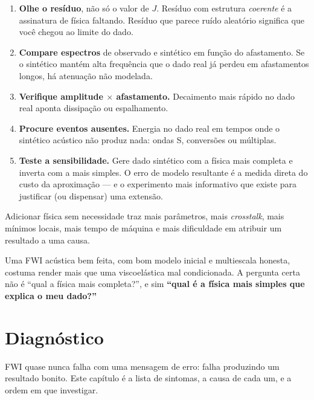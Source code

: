 \documentclass[11pt,a4paper,oneside]{report}
\begin{document}
\begin{enumerate}[leftmargin=*]
\item \textbf{Olhe o res\'iduo}, n\~ao s\'o o valor de $J$. Res\'iduo com
estrutura \emph{coerente} \'e a assinatura de f\'isica faltando. Res\'iduo que
parece ru\'ido aleat\'orio significa que voc\^e chegou ao limite do dado.
\item \textbf{Compare espectros} de observado e sint\'etico em fun\c{c}\~ao do
afastamento. Se o sint\'etico mant\'em alta frequ\^encia que o dado real j\'a
perdeu em afastamentos longos, h\'a atenua\c{c}\~ao n\~ao modelada.
\item \textbf{Verifique amplitude $\times$ afastamento.} Decaimento mais
r\'apido no dado real aponta dissipa\c{c}\~ao ou espalhamento.
\item \textbf{Procure eventos ausentes.} Energia no dado real em tempos onde o
sint\'etico ac\'ustico n\~ao produz nada: ondas S, convers\~oes ou m\'ultiplas.
\item \textbf{Teste a sensibilidade.} Gere dado sint\'etico com a f\'isica mais
completa e inverta com a mais simples. O erro de modelo resultante \'e a
medida direta do custo da aproxima\c{c}\~ao --- e o experimento mais
informativo que existe para justificar (ou dispensar) uma extens\~ao.
\end{enumerate}

\begin{armadilha}
Adicionar f\'isica sem necessidade traz mais par\^ametros, mais
\emph{crosstalk}, mais m\'inimos locais, mais tempo de m\'aquina e mais
dificuldade em atribuir um resultado a uma causa.

Uma FWI ac\'ustica bem feita, com bom modelo inicial e multiescala honesta,
costuma render mais que uma viscoel\'astica mal condicionada. A pergunta certa
n\~ao \'e ``qual a f\'isica mais completa?'', e sim \textbf{``qual \'e a
f\'isica mais simples que explica o meu dado?''}
\end{armadilha}

\chapter{Diagn\'ostico}
\label{cap:diagnostico}

\begin{ideia}
FWI quase nunca falha com uma mensagem de erro: falha produzindo um resultado
bonito. Este cap\'itulo \'e a lista de sintomas, a causa de cada um, e a ordem
em que investigar.
\end{ideia}
\end{document}
